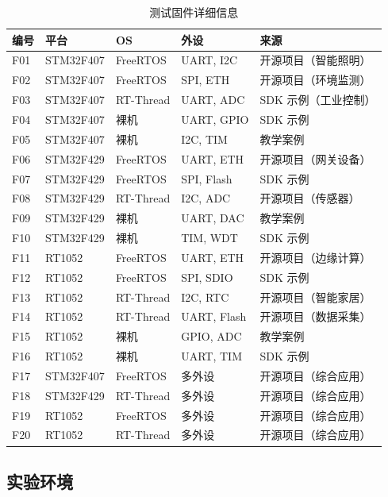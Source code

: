 \begin{table}[htbp]
\centering
\caption{测试固件详细信息}
\label{tab:firmware}
\small
\begin{tabular}{llllp{3cm}}
\toprule
\textbf{编号} & \textbf{平台} & \textbf{OS} & \textbf{外设} & \textbf{来源} \\
\midrule
F01 & STM32F407 & FreeRTOS & UART, I2C & 开源项目（智能照明） \\
F02 & STM32F407 & FreeRTOS & SPI, ETH & 开源项目（环境监测） \\
F03 & STM32F407 & RT-Thread & UART, ADC & SDK 示例（工业控制） \\
F04 & STM32F407 & 裸机 & UART, GPIO & SDK 示例 \\
F05 & STM32F407 & 裸机 & I2C, TIM & 教学案例 \\
F06 & STM32F429 & FreeRTOS & UART, ETH & 开源项目（网关设备） \\
F07 & STM32F429 & FreeRTOS & SPI, Flash & SDK 示例 \\
F08 & STM32F429 & RT-Thread & I2C, ADC & 开源项目（传感器） \\
F09 & STM32F429 & 裸机 & UART, DAC & 教学案例 \\
F10 & STM32F429 & 裸机 & TIM, WDT & SDK 示例 \\
F11 & RT1052 & FreeRTOS & UART, ETH & 开源项目（边缘计算） \\
F12 & RT1052 & FreeRTOS & SPI, SDIO & SDK 示例 \\
F13 & RT1052 & RT-Thread & I2C, RTC & 开源项目（智能家居） \\
F14 & RT1052 & RT-Thread & UART, Flash & 开源项目（数据采集） \\
F15 & RT1052 & 裸机 & GPIO, ADC & 教学案例 \\
F16 & RT1052 & 裸机 & UART, TIM & SDK 示例 \\
F17 & STM32F407 & FreeRTOS & 多外设 & 开源项目（综合应用） \\
F18 & STM32F429 & RT-Thread & 多外设 & 开源项目（综合应用） \\
F19 & RT1052 & FreeRTOS & 多外设 & 开源项目（综合应用） \\
F20 & RT1052 & RT-Thread & 多外设 & 开源项目（综合应用） \\
\bottomrule
\end{tabular}
\end{table}

\subsection{实验环境}

